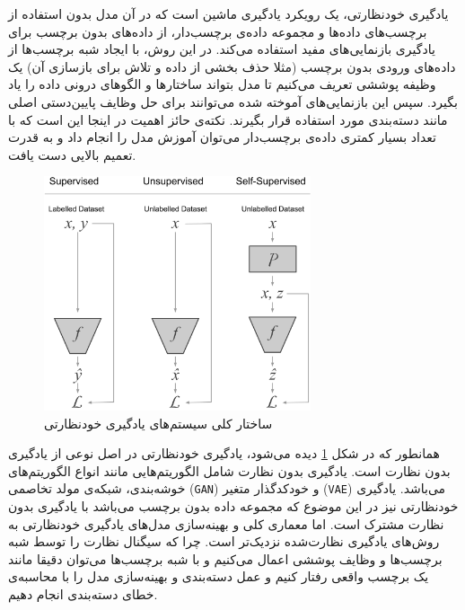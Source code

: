 یادگیری خودنظارتی، یک رویکرد یادگیری ماشین است که در آن مدل بدون استفاده از برچسب‌های داده‌ها و مجموعه داده‌ی برچسب‌دار، از داده‌های بدون برچسب برای یادگیری بازنمایی‌های مفید استفاده می‌کند. در این روش، با ایجاد شبه برچسب‌ها از داده‌های ورودی بدون برچسب (مثلا حذف بخشی از داده و تلاش برای بازسازی آن) یک وظیفه پوششی تعریف می‌کنیم تا مدل بتواند ساختارها و الگوهای درونی داده را یاد بگیرد. سپس این بازنمایی‌های آموخته شده می‌توانند برای حل وظایف پایین‌دستی اصلی مانند دسته‌بندی مورد استفاده قرار بگیرند. نکته‌ی حائز اهمیت در اینجا این است که با تعداد بسیار کمتری داده‌ی برچسب‌دار می‌توان آموزش مدل را انجام داد و به قدرت تعمیم بالایی دست یافت.

\begin{figure}[htbp]
  \centering
  \includegraphics[width=0.7\textwidth]{Images/Chapter2/self-vs-unsupervised.png}
  \caption{ساختار کلی سیستم‌های یادگیری خودنظارتی}
  \label{fig:self-vs-unsupervised}
\end{figure}

همانطور که در شکل \ref{fig:self-vs-unsupervised}
دیده می‌شود، یادگیری خودنظارتی در اصل نوعی از یادگیری بدون نظارت است\cite{ericsson2022self}.
یادگیری بدون نظارت شامل الگوریتم‌هایی مانند انواع
الگوریتم‌های خوشه‌بندی،
شبکه‌ی مولد تخاصمی (\verb|GAN|)
و خودکدگذار متغیر (\verb|VAE|)
می‌باشد. یادگیری خودنظارتی نیز در این موضوع که مجموعه داده بدون برچسب می‌باشد با یادگیری بدون نظارت مشترک است. اما معماری کلی و
بهینه‌سازی
مدل‌های یادگیری خودنظارتی به روش‌های یادگیری نظارت‌شده نزدیک‌تر است. چرا که سیگنال نظارت را توسط شبه برچسب‌ها و وظایف پوششی اعمال می‌کنیم و با شبه برچسب‌ها می‌توان دقیقا مانند یک برچسب واقعی رفتار کنیم و عمل دسته‌بندی و بهینه‌سازی مدل را با محاسبه‌ی خطای دسته‌بندی انجام دهیم.

